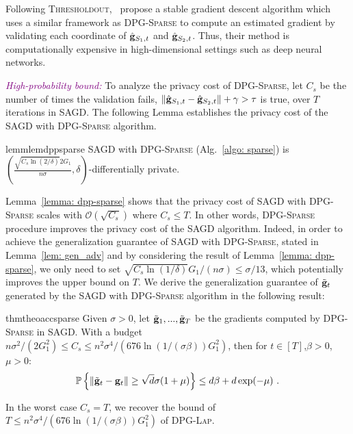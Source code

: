 \documentclass[11pt]{article}
\begin{document}
Following \textsc{Thresholdout},~\citep{zhch2018} propose a stable gradient descent algorithm which uses a similar framework as \textsc{DPG-Sparse} to compute an estimated gradient by validating each coordinate of $\hat {\mathbf{g}}_{S_1,t}$ and $\hat {\mathbf{g}}_{S_2,t}$. 
Thus, their method is computationally expensive in high-dimensional settings such as deep neural networks. 

\textcolor{purple}{\textit{High-probability bound:}}
To analyze the privacy cost of \textsc{DPG-Sparse}, let $C_{s}$ be the number of times the validation fails, \ie $\| \hat {\mathbf{g}}_{S_1,t} - \hat {\mathbf{g}}_{S_2,t}\| + \gamma >  \tau$ is true, over $T$ iterations in \textsc{SAGD}. The following Lemma establishes the privacy cost of the \textsc{SAGD} with \textsc{DPG-Sparse} algorithm.
\begin{restatable}{lemm}{lemdppsparse}
\label{lemma: dpp-sparse}
\textsc{SAGD} with \textsc{DPG-Sparse}  (Alg.~\ref{algo: sparse}) is  
$(\frac{\sqrt{C_{s} \ln(2/\delta)} 2G_1}{n\sigma}, \delta)$-differentially private. 
\end{restatable}
Lemma~\ref{lemma: dpp-sparse} shows that the privacy cost of  \textsc{SAGD} with \textsc{DPG-Sparse} scales with $\mathcal{O}(\sqrt{C_{s}})$ where $C_{s} \leq T$. 
In other words, \textsc{DPG-Sparse} procedure improves the privacy cost of the \textsc{SAGD} algorithm. 
Indeed, in order to achieve the generalization guarantee of \textsc{SAGD} with \textsc{DPG-Sparse}, stated in Lemma~\ref{lem: gen_adv} and  by considering the result of Lemma~\ref{lemma: dpp-sparse},  we only need to set $\sqrt{C_{s} \ln(1/\delta)} G_1/(n\sigma) \leq \sigma/13$, which potentially improves the upper bound on $T$. 
We derive the generalization guarantee of $\tilde {\mathbf{g}}_t$ generated by the \textsc{SAGD} with \textsc{DPG-Sparse} algorithm in the following result:
\begin{restatable}{thm}{theoaccsparse}
\label{thm: acc_sparse}
Given $\sigma > 0$, let $\tilde {\mathbf{g}}_1,...,  \tilde {\mathbf{g}}_T$ be the gradients computed by \textsc{DPG-Sparse} in \textsc{SAGD}. With a budget $ n\sigma^2/(2G_1^2) \leq C_{s} \leq n^2 \sigma^4/(676 \ln(1/(\sigma \beta))G_1^2)$, then for $t \in [T]$,$\beta > 0$, $\mu > 0$:
        \begin{equation*}
    \mathbb{P}\left\{\|\tilde {\mathbf{g}}_t - \mathbf{g}_t\| \geq \sqrt{d}\sigma(1+\mu)\right\} \leq d\beta + d\exp(-\mu)~.
    \end{equation*}
\end{restatable}
In the worst case $C_{s} = T$, we recover the bound of $T \leq n^2 \sigma^4/(676 \ln(1/(\sigma \beta))G_1^2)$ of \textsc{DPG-Lap}.
\end{document}
